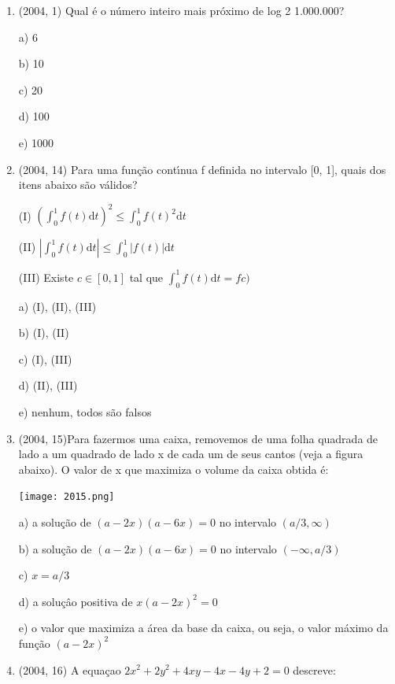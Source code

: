 \documentclass{article}
\begin{document}
\begin{enumerate}
\item(2004, 1) Qual é o número inteiro mais próximo de log 2 1.000.000?

a) 6

b) 10

c) 20

d) 100

e) 1000 \newline





\item(2004, 14) Para uma função contı́nua f definida no intervalo [0, 1], quais dos itens abaixo são
válidos?

(I) $\left(\int_{0}^{1} f(t) \mathrm{d} t\right)^{2} \leq \int_{0}^{1} f(t)^{2} \mathrm{d} t$

(II) $\left|\int_{0}^{1} f(t) \mathrm{d} t\right| \leq \int_{0}^{1}|f(t)| \mathrm{d} t$

(III) Existe $c \in[0,1]$ tal que $\int_{0}^{1} f(t) \mathrm{d} t=fc)$



a) (I), (II), (III)

b) (I), (II)

c) (I), (III)

d) (II), (III)

e) nenhum, todos são falsos \newline


    
\item(2004, 15)Para fazermos uma caixa, removemos de uma folha quadrada de lado a um quadrado de lado x de cada um de seus cantos (veja a figura abaixo). O valor de x que maximiza o volume da caixa obtida é:

\texttt{[image: 2015.png]}\newline


a) a solução de $(a-2 x)(a-6 x)=0$ no intervalo $(a / 3, \infty)$

b) a solução de $(a-2 x)(a-6 x)=0$ no intervalo $(-\infty, a / 3)$

c) $x=a / 3$

d) a soluçâo positiva de $x(a-2 x)^{2}=0$

e) o valor que maximiza a área da base da caixa, ou seja, o valor máximo da função $(a-2 x)^{2}$\newline


\item(2004, 16) A equaçao $2 x^{2}+2 y^{2}+4 x y-4 x-4 y+2=0$ descreve:


\end{enumerate}
\end{document}
